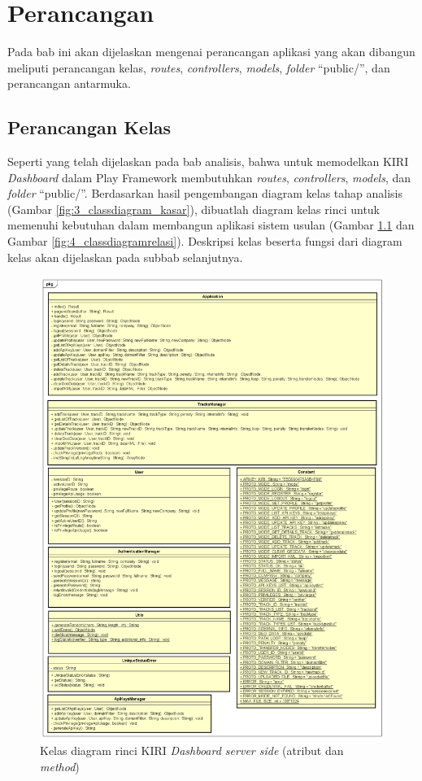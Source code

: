 \chapter{Perancangan}
\label{chap:perancangan}
Pada bab ini akan dijelaskan mengenai perancangan aplikasi yang akan dibangun meliputi perancangan kelas, \textit{routes}, \textit{controllers}, \textit{models}, \textit{folder} ``public/'', dan perancangan antarmuka.

\section{Perancangan Kelas}
\label{sec:diagramkelas}
Seperti yang telah dijelaskan pada bab analisis, bahwa untuk memodelkan KIRI \textit{Dashboard} dalam Play Framework membutuhkan \textit{routes}, \textit{controllers}, \textit{models}, dan \textit{folder} ``public/''. Berdasarkan hasil pengembangan diagram kelas tahap analisis (Gambar \ref{fig:3_classdiagram_kasar}), dibuatlah diagram kelas rinci untuk memenuhi kebutuhan dalam membangun aplikasi sistem usulan (Gambar \ref{fig:4_classdiagramatribut} dan Gambar \ref{fig:4_classdiagramrelasi}). Deskripsi kelas beserta fungsi dari diagram kelas akan dijelaskan pada subbab selanjutnya.

\begin{figure}[htbp]
	\centering
		\includegraphics[scale=0.45]{Gambar/4_classdiagram_atribut.png}
	\caption{Kelas diagram rinci KIRI \textit{Dashboard server side} (atribut dan \textit{method})}
	\label{fig:4_classdiagramatribut}
\end{figure}

